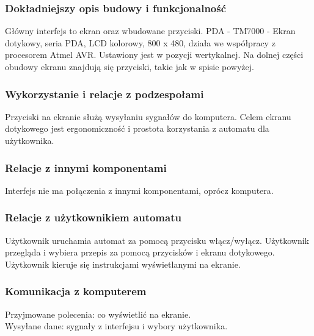 \documentclass[12pt,a4paper,notitlepage]{article}
\begin{document}
\subsubsection{Dokładniejszy opis budowy i funkcjonalność}
Główny interfejs to ekran oraz wbudowane przyciski. PDA - TM7000 -  Ekran dotykowy, seria PDA, LCD kolorowy, 800 x 480, działa we współpracy z procesorem Atmel AVR. Ustawiony jest w pozycji wertykalnej. Na dolnej części obudowy ekranu znajdują się przyciski, takie jak w spisie powyżej.
 
\subsubsection{Wykorzystanie i relacje z podzespołami}
Przyciski na ekranie służą wysyłaniu sygnałów do komputera. Celem ekranu dotykowego jest ergonomiczność i prostota korzystania z automatu dla użytkownika.

\subsubsection{Relacje z innymi komponentami}
Interfejs nie ma połączenia z innymi komponentami, oprócz komputera.

\subsubsection{Relacje z użytkownikiem automatu}
Użytkownik uruchamia automat za pomocą przycisku włącz/wyłącz. Użytkownik przegląda i wybiera przepis za pomocą przycisków i ekranu dotykowego. Użytkownik kieruje się instrukcjami wyświetlanymi na ekranie.

\subsubsection{Komunikacja z komputerem}
Przyjmowane polecenia: co wyświetlić na ekranie.\\
Wysyłane dane: sygnały z interfejsu i wybory użytkownika.
\end{document}
